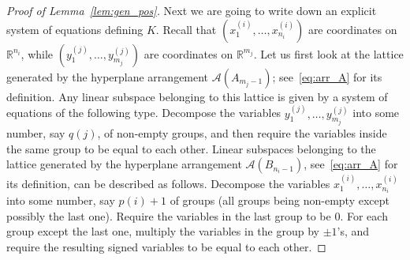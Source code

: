 \documentclass[12pt, reqno]{amsart}
\theoremstyle{plain}
\theoremstyle{definition}
\theoremstyle{remark}
\begin{document}
\begin{proof}[Proof of Lemma~\ref{lem:gen_pos}]
Next we are going to write down an explicit system of equations defining $K$. Recall that $(x_1^{(i)}, \ldots, x_{n_i}^{(i)})$ are coordinates on ${\mathbb{R}}^{n_i}$, while $(y_1^{(j)}, \ldots, y_{m_j}^{(j)})$ are coordinates on ${\mathbb{R}}^{m_j}$. Let us first look at the lattice generated by the hyperplane arrangement ${\mathcal{A}}(A_{m_j-1})$; see~\eqref{eq:arr_A} for its definition.  Any linear subspace belonging to this lattice is given by a system of equations of the following type. Decompose the variables $y_{1}^{(j)},\ldots, y_{m_j}^{(j)}$ into some number, say $q(j)$, of non-empty groups, and then require the variables inside the same group to be equal to each other. Linear subspaces belonging to  the lattice generated by the hyperplane arrangement ${\mathcal{A}}(B_{n_i-1})$, see~\eqref{eq:arr_A} for its definition, can be described as follows. Decompose the variables $x_1^{(i)}, \ldots, x_{n_i}^{(i)}$ into some number, say $p(i)+1$ of groups (all groups being non-empty except possibly the last one). Require the variables in the last group to be $0$. For each group except the last one,  multiply the variables in the group by $\pm 1$'s, and require the resulting signed variables to be equal to each other.


\end{proof}
\end{document}
